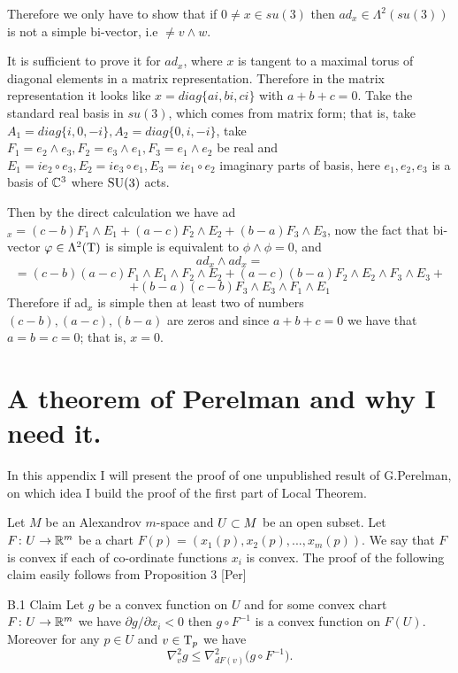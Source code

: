 \documentclass{article}
\begin{document}
Therefore we only have  to show that if $0\not=x\in su(3)$ then
$ad_x\in \Lambda^2(su(3))$ is not a simple bi-vector, i.e $\not=
v\wedge w$.

It is sufficient to prove it for $ad_x$, where $x$ is tangent to a
maximal torus of diagonal elements in a matrix representation.
Therefore in the matrix representation it looks like
$x=diag\{ai,bi,ci\}$ with $a+b+c=0$. Take the standard real basis
in $su(3)$, which comes from matrix form;
that is, take
 $A_1=diag \{i,0,-i\},A_2=diag \{0,i,-i\}$, take
 $F_1=e_2\wedge e_3,F_2= e_3\wedge e_1,F_3=e_1\wedge e_2$ be real and
$E_1=i e_2\circ e_3,E_2=i e_3\circ e_1,E_3=i e_1\circ e_2$
imaginary parts of basis, here $e_1,e_2,e_3$ is a basis of $\mathbb{C}^3$
where $\text{\rm SU}(3)$ acts.

Then by the direct calculation we have
ad$_x=(c-b)F_1\wedge E_1+(a-c)F_2\wedge E_2 + (b-a) F_3\wedge E_3$,
now the fact that bi-vector $\varphi\in \Lambda^2(\text{\rm T})$
is simple is equivalent to $\phi\wedge\phi=0$, and
$$ad_x\wedge ad_x=$$
$$=(c-b)(a-c)F_1\wedge E_1\wedge F_2\wedge E_2
+
(a-c)(b-a)F_2\wedge E_2\wedge F_3\wedge E_3
+$$
$$+(b-a)(c-b)F_3\wedge E_3\wedge F_1\wedge E_1$$
Therefore if ad$_x$ is simple then at least two
of numbers $(c-b),(a-c),(b-a)$ are zeros
and since $a+b+c=0$ we have that  $a=b=c=0$; that is, $x=0$. \qeds



\section{A theorem of Perelman and why I need it.}


In this appendix I will present the proof of one unpublished
result of G.Perelman, on which idea I build the proof of the first
part of Local Theorem.

Let $M$ be an Alexandrov $m$-space and $U\subset M$ be an open subset.
Let $F\colon U\to \mathbb{R}^m$ be a chart $F(p)=(x_1(p),x_2(p),...,x_m(p))$.
We say that $F$ is convex if each of co-ordinate functions $x_i$
is convex. The proof of the following claim easily follows from
Proposition 3 [Per]


\begin{thm}{B.1 Claim} Let $g$ be a convex function on $U$ and for some
convex chart $F\colon U\to \mathbb{R}^m$ we have $\partial g/\partial x_i< 0$
then $g\circ F^{-1}$ is a convex function on $F(U)$. Moreover for
any $p\in U$ and  $v\in \text{\rm T}_p$ we have
$$\nabla^2_vg\le\nabla^2_{dF(v)}\bigl(g\circ F^{-1}\bigr).$$
\end{thm}
\end{document}
